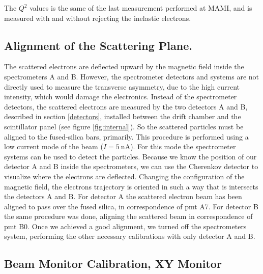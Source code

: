 The $Q^{2}$ values is the same of the last measurement performed at MAMI, and is measured with and without rejecting the inelastic electrons. 

\subsection{Alignment of the Scattering Plane.}

The scattered electrons are deflected upward by the magnetic field inside the spectrometers A and B. However, the spectrometer detectors and systems are not directly used to measure the transverse asymmetry, due to the high current intensity, which would damage the electronics.
Instead of the spectrometer detectors, the scattered electrons are measured by the two detectors A and B, described in section \ref{detectors}, installed between the drift chamber and the scintillator panel (see figure \ref{fig:internal}). So the scattered particles must be aligned to the fused-silica bars, primarily.
This procedure is performed using a low current mode of the beam ($I = \SI{5}{\nano \ampere}$). For this mode the spectrometer systems can be used to detect the particles. Because we know the position of our detector A and B inside the spectrometers, we can use the Cherenkov detector to visualize where the electrons are deflected. Changing the configuration of the magnetic field, the electrons trajectory is oriented in such a way that is intersects the detectors A and B. For detector A the scattered electron beam has been aligned to pass over the fused silica, in correspondence of pmt A7. For detector B the same procedure was done, aligning the scattered beam in correspondence of pmt B0. 
 Once we achieved a good alignment, we turned off the spectrometers system, performing the other necessary calibrations with only detector A and B. 

\subsection{Beam Monitor Calibration, XY Monitor}


